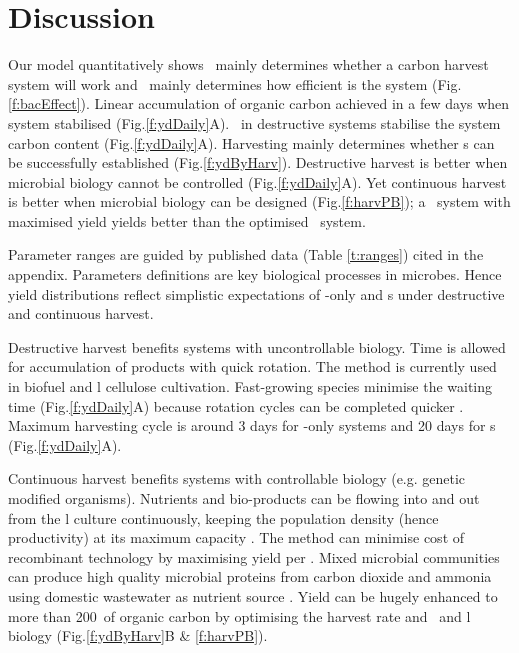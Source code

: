 \documentclass[../thesis.tex]{subfiles} %
\begin{document}
\section{Discussion}
Our model quantitatively shows \bac\ mainly determines whether a carbon harvest system will work and \phy\ mainly determines how efficient is the system (Fig.\ref{f:bacEffect}).  Linear accumulation of organic carbon achieved in a few days when system stabilised (Fig.\ref{f:ydDaily}A).  \Bac\ in destructive systems stabilise the system carbon content (Fig.\ref{f:ydDaily}A).  Harvesting mainly determines whether \pbs s can be successfully established (Fig.\ref{f:ydByHarv}).  Destructive harvest is better when microbial biology cannot be controlled (Fig.\ref{f:ydDaily}A).  Yet continuous harvest is better when microbial biology can be designed (Fig.\ref{f:harvPB}); a \PBH\ system with maximised yield yields better than the optimised \PBN\ system.

Parameter ranges are guided by published data (Table \ref{t:ranges}) cited in the appendix.  Parameters definitions are key biological processes in microbes.  Hence yield distributions reflect simplistic expectations of \phy-only and \pbs s under destructive and continuous harvest.

Destructive harvest benefits systems with uncontrollable biology.  Time is allowed for accumulation of products with quick rotation.  The method is currently used in biofuel \autocite{robertson2017cellulosic} and \bac l cellulose \autocite{aytekin2016statistical} cultivation.  Fast-growing species minimise the waiting time (Fig.\ref{f:ydDaily}A) because rotation cycles can be completed quicker \autocite{robertson2017cellulosic}.  Maximum harvesting cycle is around 3 days for \phy-only systems and 20 days for \pbs s (Fig.\ref{f:ydDaily}A).

Continuous harvest benefits systems with controllable biology (e.g. genetic modified organisms).  Nutrients and bio-products can be flowing into and out from the \bac l culture continuously, keeping the population density (hence productivity) at its maximum capacity \autocite{huang2012industrial,matassa2016autotrophic}.  The method can minimise cost of recombinant technology by maximising yield per \bac.  Mixed microbial communities can produce high quality microbial proteins from carbon dioxide and ammonia using domestic wastewater as nutrient source \autocite{matassa2016autotrophic}.  Yield can be hugely enhanced to more than 200\dxdt\ of organic carbon by optimising the harvest rate and \phy\ and \bac l biology (Fig.\ref{f:ydByHarv}B \& \ref{f:harvPB}).
\end{document}
